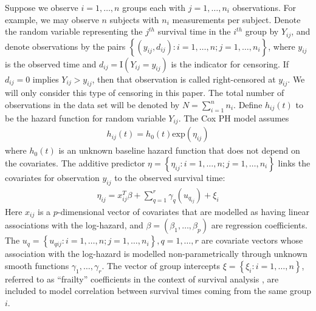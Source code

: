 \documentclass[]{article}
\begin{document}
Suppose we observe $i = 1,\ldots,n$ groups each with $j = 1,\ldots,n_{i}$ observations. For example, we may observe $n$ subjects with $n_{i}$ measurements per subject. Denote the random variable representing the $j^{th}$ survival time in the $i^{th}$ group by $Y_{ij}$, and denote observations by the pairs $ \left\{(y_{ij},d_{ij}): i = 1,\ldots,n; j = 1,\ldots,n_{i} \right\}$, where $y_{ij}$ is the observed time and $d_{ij} = \text{I}(Y_{ij} = y_{ij})$ is the indicator for censoring. If $d_{ij} = 0$ implies $Y_{ij} > y_{ij}$, then that observation is called right-censored at $y_{ij}$. We will only consider this type of censoring in this paper. The total number of observations in the data set will be denoted by $N = \sum_{i=1}^{n}n_{i}$.
Define $h_{ij}(t)$ to be the hazard function for random variable $Y_{ij}$. The Cox PH model assumes \citep{coxph}
\begin{equation}\begin{aligned}\label{eqn:CoxHazardModel}
h_{ij}(t) = h_0(t)\text{exp}(\eta_{ij})
\end{aligned}\end{equation}
where $h_0(t)$ is an unknown baseline hazard function that does not depend on the covariates. The additive predictor $\eta = \left\{ \eta_{ij}: i = 1,\ldots,n; j = 1,\ldots,n_{i}\right\}$ links the covariates for observation $y_{ij}$ to the observed survival time:
\begin{equation}\begin{aligned}\label{eqn:eta}
\eta_{ij} =x_{ij}^{T}\beta+\sum_{q=1}^{r} \gamma_q(u_{q_{ij}}) +\xi_{i}
\end{aligned}\end{equation}
Here $x_{ij}$ is a $p$-dimensional vector of covariates that are modelled as having linear associations with the log-hazard, and $\beta = (\beta_{1},\ldots,\beta_{p})$ are regression coefficients. The $u_{q} = \left\{u_{qij}: i = 1,\ldots,n; j = 1,\ldots,n_{i} \right\}, q = 1,\ldots,r$ are covariate vectors whose association with the log-hazard is modelled non-parametrically through unknown smooth functions $\gamma_1,\ldots,\gamma_r$. The vector of group intercepts $\xi = \left\{ \xi_{i}: i=1,\ldots,n\right\}$, referred to as ``frailty'' coefficients in the context of survival analysis \citep{frailty}, are included to model correlation between survival times coming from the same group $i$.
\end{document}

